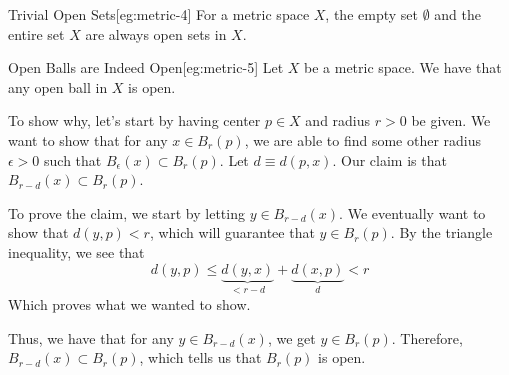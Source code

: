 \begin{egBox}{Trivial Open Sets}[eg:metric-4]
    For a metric space \( X \), the empty set \( \emptyset \) and the entire set
    \( X \) are always open sets in \( X \).
\end{egBox}

\begin{egBox}{Open Balls are Indeed Open}[eg:metric-5]
    Let \( X \) be a metric space.
    We have that any open ball in \( X \) is open.

    \baseSkip

    To show why, let's start by having center \( p \in X \) and radius 
    \( r > 0 \) be given.
    We want to show that for any \( x \in B_{ r }( p ) \), we are able to find
    some other radius \( \epsilon > 0 \) such that \( B_{ \epsilon }( x ) 
    \subset B_{ r }( p ) \). 
    Let \( d \equiv d( p, x ) \).
    Our claim is that \( B_{ r - d }( x ) \subset B_{ r }( p ) \).

    \baseSkip 

    To prove the claim, we start by letting \( y \in B_{ r - d }( x ) \).
    We eventually want to show that \( d( y, p ) < r \), which will guarantee 
    that \( y \in B_{ r }( p ) \).
    By the triangle inequality, we see that 
    \begin{equation*}
        d ( y, p ) 
        \leq 
        \underbrace{ d ( y, x ) }_{ < r - d } + 
        \underbrace{ d ( x, p ) }_{ d }
        <
        r
    \end{equation*}
    Which proves what we wanted to show.

    \baseSkip 

    Thus, we have that for any \( y \in B_{ r - d }( x ) \), we get 
    \( y \in B_{ r }( p ) \).
    Therefore,  \( B_{ r - d }( x ) \subset B_{ r }( p ) \), which tells us that
    \( B_{ r }( p ) \) is open.
\end{egBox}